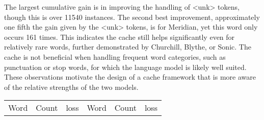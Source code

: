 \documentclass{article}
\begin{document}
The largest cumulative gain is in improving the handling of <unk> tokens, though this is over 11540 instances.
The second best improvement, approximately one fifth the gain given by the <unk> tokens, is for Meridian, yet this word only occurs 161 times.
This indicates the cache still helps significantly even for relatively rare words, further demonstrated by Churchill, Blythe, or Sonic.
The cache is not beneficial when handling frequent word categories, such as punctuation or stop words, for which the language model is likely well suited.
These observations motivate the design of a cache framework that is more aware of the relative strengths of the two models.

\begin{table}
\begin{center}\small
\begin{tabular}{lrr|lrr}
\toprule[0.3ex]
Word & Count & loss & Word & Count & loss \\
 

\end{tabular}
\end{center}
\end{table}
\end{document}
